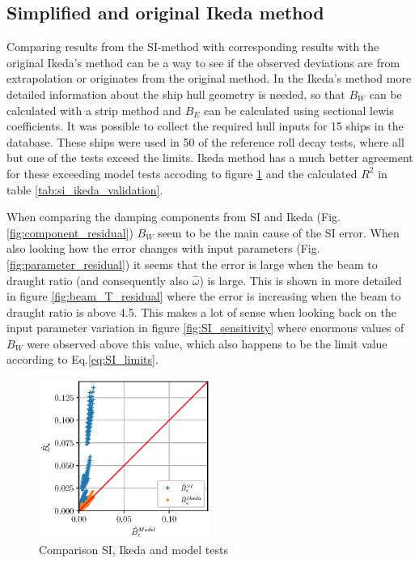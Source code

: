 \subsection{Simplified and original Ikeda method}
\label{se:si_ikeda_model}
Comparing results from the SI-method with corresponding results with the original Ikeda's method can be a way to see if the observed deviations are from extrapolation or originates from the original method. In the Ikeda's method more detailed information about the ship hull geometry is needed, so that $B_W$ can be calculated with a strip method and $B_E$ can be calculated using sectional lewis coefficients. It was possible to collect the required hull inputs for 15 ships in the database. These ships were used in 50 of the reference roll decay tests, where all but one of the tests exceed the limits. Ikeda method has a much better agreement for these exceeding model tests accoding to figure \ref{fig:si_ikeda_model} and the calculated $R^2$ in table \ref{tab:si_ikeda_validation}.


When comparing the damping components from SI and Ikeda (Fig.\ref{fig:component_residual}) $B_W$ seem to be the main cause of the SI error. When also looking how the error changes with input parameters (Fig.\ref{fig:parameter_residual}) it seems that the error is large when the beam to draught ratio (and consequently also $\hat{\omega}$) is large. This is shown in more detailed in figure \ref{fig:beam_T_residual} where the error is increasing when the beam to draught ratio is above 4.5. This makes a lot of sense when looking back on the input parameter variation in figure \ref{fig:SI_sensitivity} where enormous values of $B_W$ were observed above this value, which also happens to be the limit value according to Eq.\ref{eq:SI_limits}.

\begin{figure}[H]

    \centering
    \includegraphics[width=0.5\textwidth]{figures/si_ikeda_model.eps}
    \caption{Comparison SI, Ikeda and model tests}
    \label{fig:si_ikeda_model}

\end{figure}



